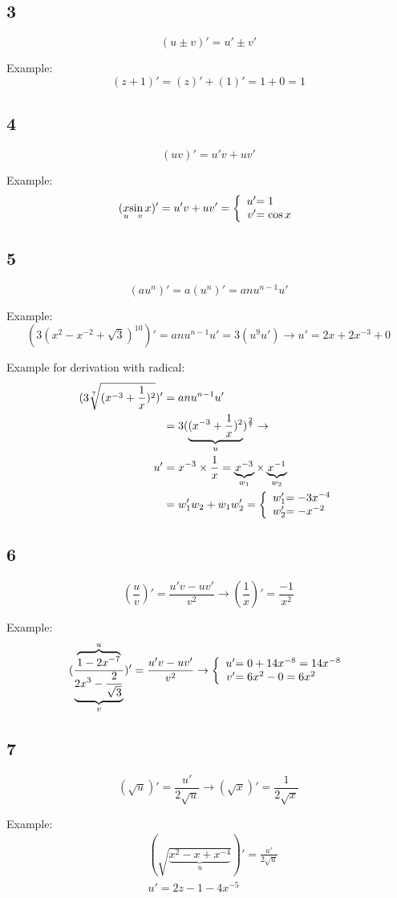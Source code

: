 \subsection{3}
\[ (u \pm v)' = u' \pm v' \]

Example:
\[ (z + 1)' = (z)' + (1)' = 1 + 0 = 1 \]

\subsection{4}
\[ (uv)' = u'v + uv' \]

Example:
\begin{align*}
(\underset{u}{x}\underset{v}{\sin x})' = u'v + uv' = 
\left\lbrace
\begin{array}{r@{}l}
	u' &= 1 \\
	v' &= \cos x
\end{array}
\right.
\end{align*}

\subsection{5}
\[ (au^n)' = a(u^n)' = anu^{n-1}u' \]

Example:
\[ (3(x^2-x^{-2}+\sqrt{3})^{10})' = anu^{n-1}u' = 3(u^9u') \to u' = 2x +2x^{-3} + 0 \]

Example for derivation with radical:
\begin{align*}
(3\sqrt[7]{(x^{-3}+\frac{1}{x})^2})' &= anu^{n-1}u' \\
&= 3(\underbrace{(x^{-3}+\frac{1}{x})^2}_u)^{\frac{2}{7}} \to \\
u' &= x^{-3}\times\frac{1}{x} =
\underbrace{x^{-3}}_{w_1} \times \underbrace{x^{-1}}_{w_2} \\
&= w_1'w_2+w_1w_2' = 
\left\lbrace
\begin{array}{r@{}l}
	w_1' &= -3x^{-4} \\
	w_2' &= -x^{-2}
\end{array}
\right.
\end{align*}

\subsection{6}
\[ (\frac{u}{v})' = \frac{u'v - uv'}{v^2} \to (\frac{1}{x})' = \frac{-1}{x^2} \]

Example:
\begin{align*}
(\frac{\overbrace{1-2x^{-7}}^u}{\underbrace{2x^3-\frac{2}{\sqrt{3}}}_v})' = \frac{u'v - uv'}{v^2} \to
\left\lbrace
\begin{array}{r@{}l}
	u' &= 0 + 14x^{-8} = 14x^{-8} \\
	v' &= 6x^2-0 = 6x^2
\end{array}
\right.
\end{align*}

\subsection{7}
\[ (\sqrt{u})' = \frac{u'}{2\sqrt{u}} \to (\sqrt{x})' = \frac{1}{2\sqrt{x}} \]

Example:
\begin{align*}
&(\sqrt{\underbrace{x^2-x+x^{-4}}_u})' = \frac{u'}{2\sqrt{u}} \\
&u' = 2z-1-4x^{-5}
\end{align*}
